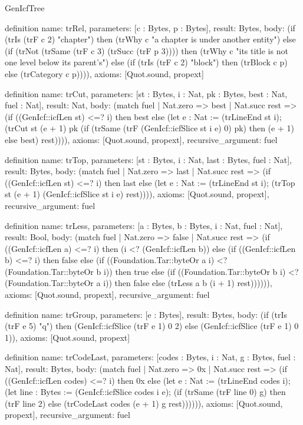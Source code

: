 \begin{lexlean}{GenIcfTree}
\begin{semanticmodule}
definition{
  name: trRel,
  parameters: [c : Bytes, p : Bytes],
  result: Bytes,
  body: (if (trIs (trF c 2) "chapter") then (trWhy c "a chapter is under another entity") else (if (trNot (trSame (trF c 3) (trSucc (trF p 3)))) then (trWhy c "its title is not one level below its parent's") else (if (trIs (trF c 2) "block") then (trBlock c p) else (trCategory c p)))),
  axioms: [Quot.sound, propext]
}

definition{
  name: trCut,
  parameters: [st : Bytes, i : Nat, pk : Bytes, best : Nat, fuel : Nat],
  result: Nat,
  body: (match fuel
    | Nat.zero => best
    | Nat.succ rest => (if ((GenIcf::icfLen st) <=? i) then best else (let e : Nat := (trLineEnd st i); (trCut st (e + 1) pk (if (trSame (trF (GenIcf::icfSlice st i e) 0) pk) then (e + 1) else best) rest)))),
  axioms: [Quot.sound, propext],
  recursive_argument: fuel
}

definition{
  name: trTop,
  parameters: [st : Bytes, i : Nat, last : Bytes, fuel : Nat],
  result: Bytes,
  body: (match fuel
    | Nat.zero => last
    | Nat.succ rest => (if ((GenIcf::icfLen st) <=? i) then last else (let e : Nat := (trLineEnd st i); (trTop st (e + 1) (GenIcf::icfSlice st i e) rest)))),
  axioms: [Quot.sound, propext],
  recursive_argument: fuel
}

definition{
  name: trLess,
  parameters: [a : Bytes, b : Bytes, i : Nat, fuel : Nat],
  result: Bool,
  body: (match fuel
    | Nat.zero => false
    | Nat.succ rest => (if ((GenIcf::icfLen a) <=? i) then (i <? (GenIcf::icfLen b)) else (if ((GenIcf::icfLen b) <=? i) then false else (if ((Foundation.Tar::byteOr a i) <? (Foundation.Tar::byteOr b i)) then true else (if ((Foundation.Tar::byteOr b i) <? (Foundation.Tar::byteOr a i)) then false else (trLess a b (i + 1) rest)))))),
  axioms: [Quot.sound, propext],
  recursive_argument: fuel
}

definition{
  name: trGroup,
  parameters: [e : Bytes],
  result: Bytes,
  body: (if (trIs (trF e 5) "q") then (GenIcf::icfSlice (trF e 1) 0 2) else (GenIcf::icfSlice (trF e 1) 0 1)),
  axioms: [Quot.sound, propext]
}

definition{
  name: trCodeLast,
  parameters: [codes : Bytes, i : Nat, g : Bytes, fuel : Nat],
  result: Bytes,
  body: (match fuel
    | Nat.zero => 0x
    | Nat.succ rest => (if ((GenIcf::icfLen codes) <=? i) then 0x else (let e : Nat := (trLineEnd codes i); (let line : Bytes := (GenIcf::icfSlice codes i e); (if (trSame (trF line 0) g) then (trF line 2) else (trCodeLast codes (e + 1) g rest)))))),
  axioms: [Quot.sound, propext],
  recursive_argument: fuel
}


\end{semanticmodule}
\end{lexlean}
